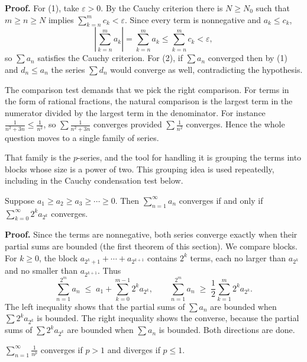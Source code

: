 \noindent\textbf{Proof.} For (1), take $\varepsilon>0$. By the Cauchy criterion there is
$N \ge N_0$ such that $m \ge n \ge N$ implies $\sum_{k=n}^{m} c_k < \varepsilon$. Since
every term is nonnegative and $a_k \le c_k$,
\[
  \left| \sum_{k=n}^{m} a_k \right| = \sum_{k=n}^{m} a_k \le \sum_{k=n}^{m} c_k
  < \varepsilon ,
\]
so $\sum a_n$ satisfies the Cauchy criterion. For (2), if $\sum a_n$ converged then by (1)
and $d_n \le a_n$ the series $\sum d_n$ would converge as well, contradicting the
hypothesis.

The comparison test demands that we pick the right comparison. For
terms in the form of rational fractions, the natural comparison is the largest term in the
numerator divided by the largest term in the denominator. For instance
$\frac{1}{n^2 + 3n} \le \frac{1}{n^2}$, so $\sum \frac{1}{n^2+3n}$ converges provided
$\sum \frac{1}{n^2}$ converges. Hence the whole question moves to a single family of
series.

That family is the $p$-series, and the tool for handling it is grouping the
terms into blocks whose size is a power of two. This grouping idea is used repeatedly,
including in the Cauchy condensation test below.

\begin{lemma}
Suppose $a_1 \ge a_2 \ge a_3 \ge \cdots \ge 0$. Then $\sum_{n=1}^{\infty} a_n$ converges
if and only if $\sum_{k=0}^{\infty} 2^k a_{2^k}$ converges.
\end{lemma}

\noindent\textbf{Proof.} Since the terms are nonnegative, both series converge exactly when
their partial sums are bounded (the first theorem of this section). We compare blocks. For
$k \ge 0$, the block $a_{2^k+1} + \cdots + a_{2^{k+1}}$ contains $2^k$ terms, each no
larger than $a_{2^k}$ and no smaller than $a_{2^{k+1}}$. Thus
\[
  \sum_{n=1}^{2^m} a_n \;\le\; a_1 + \sum_{k=0}^{m-1} 2^k a_{2^k},
  \qquad
  \sum_{n=1}^{2^m} a_n \;\ge\; \frac{1}{2}\sum_{k=1}^{m} 2^k a_{2^k}.
\]
The left inequality shows that the partial sums of $\sum a_n$ are bounded when
$\sum 2^k a_{2^k}$ is bounded. The right inequality shows the converse, because the partial
sums of $\sum 2^k a_{2^k}$ are bounded when $\sum a_n$ is bounded. Both directions are
done.

\begin{teorema}
$\sum_{n=1}^{\infty} \frac{1}{n^p}$ converges if $p > 1$ and diverges if $p \le 1$.
\end{teorema}


